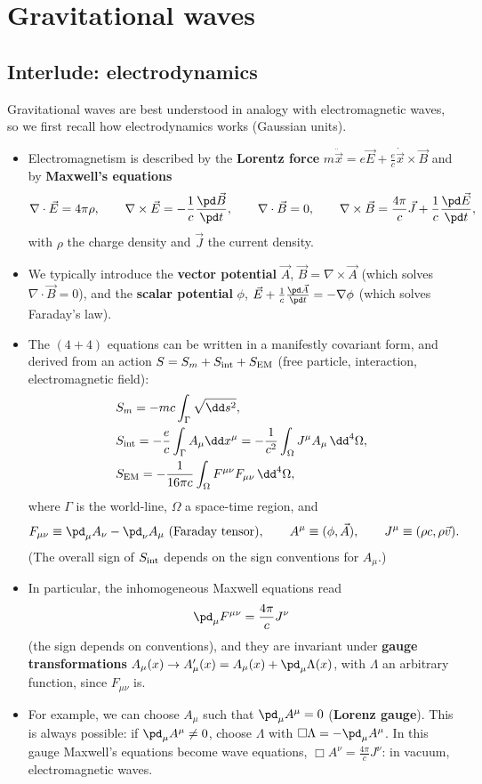 \chapter{Gravitational waves}\label{ch:gw}

\section{Interlude: electrodynamics}

Gravitational waves are best understood in analogy with electromagnetic waves, so we first recall how electrodynamics works (Gaussian units).
\begin{itemize}
\item Electromagnetism is described by the \textbf{Lorentz force} $m\ddot{\vec x}=e\vec E+\frac ec\dot{\vec x}\times\vec B$ and by \textbf{Maxwell's equations}
\[
  \nabla\cdot\vec E=4\pi\rho,\qquad\nabla\times\vec E=-\frac1c\frac{\pd\vec B}{\pd t},\qquad\nabla\cdot\vec B=0,\qquad\nabla\times\vec B=\frac{4\pi}{c}\vec J+\frac1c\frac{\pd\vec E}{\pd t},
\]
with $\rho$ the charge density and $\vec J$ the current density.
\item We typically introduce the \textbf{vector potential} $\vec A$, $\vec B=\nabla\times\vec A$ (which solves $\nabla\cdot\vec B=0$), and the \textbf{scalar potential} $\phi$, $\vec E+\frac1c\frac{\pd\vec A}{\pd t}=-\nabla\phi$ (which solves Faraday's law).
\item The $(4+4)$ equations can be written in a manifestly covariant form, and derived from an action $S=S_m+S_{\rm int}+S_{\rm EM}$ (free particle, interaction, electromagnetic field):
\begin{align*}
  &S_m=-mc\int_\Gamma\sqrt{\dd s^2},\\
  &S_{\rm int}=-\frac ec\int_\Gamma A_\mu\dd x^\mu=-\frac{1}{c^2}\int_\Omega J^\mu A_\mu\,\dd^4\Omega,\\
  &S_{\rm EM}=-\frac{1}{16\pi c}\int_\Omega F^{\mu\nu}F_{\mu\nu}\,\dd^4\Omega,
\end{align*}
where $\Gamma$ is the world-line, $\Omega$ a space-time region, and
\[
  F_{\mu\nu}\equiv\pd_\mu A_\nu-\pd_\nu A_\mu\ \text{(Faraday tensor)},\qquad A^\mu\equiv(\phi,\vec A),\qquad J^\mu\equiv(\rho c,\rho\vec v).
\]
(The overall sign of $S_{\rm int}$ depends on the sign conventions for $A_\mu$.)
\item In particular, the inhomogeneous Maxwell equations read
\begin{equation}
  \pd_\mu F^{\mu\nu}=\frac{4\pi}{c}J^\nu
\end{equation}
(the sign depends on conventions), and they are invariant under \textbf{gauge transformations} $A_\mu(x)\to A'_\mu(x)=A_\mu(x)+\pd_\mu\Lambda(x)$, with $\Lambda$ an arbitrary function, since $F_{\mu\nu}$ is.
\item For example, we can choose $A_\mu$ such that $\pd_\mu A^\mu=0$ (\textbf{Lorenz gauge}). This is always possible: if $\pd_\mu A^\mu\neq0$, choose $\Lambda$ with $\Box\Lambda=-\pd_\mu A^\mu$. In this gauge Maxwell's equations become wave equations, $\Box A^\nu=\frac{4\pi}{c}J^\nu$: in vacuum, electromagnetic waves.
\end{itemize}
